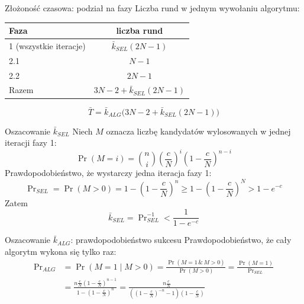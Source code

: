 \begin{frame}{Złożoność czasowa: podział na fazy}
  Liczba rund w jednym wywołaniu algorytmu:
  \medskip
  \begin{center}
    \renewcommand{\arraystretch}{1.3}
    \begin{tabular}{lc}
      \hline
      Faza & liczba rund \\
      \hline
      1 (wszystkie iteracje) & $\bar{k}_{SEL}(2N - 1)$ \\
      2.1                    & $N - 1$ \\
      2.2                    & $2N - 1$ \\
      \hline
      Razem                  & $3N - 2 + \bar{k}_{SEL}(2N - 1)$ \\
      \hline
    \end{tabular}
  \end{center}
  \pause
  \[
    \bar{T} = \bar{k}_{ALG}\bigl(3N - 2 + \bar{k}_{SEL}(2N - 1)\bigr)
  \]
\end{frame}

\begin{frame}{Oszacowanie $\bar{k}_{SEL}$}
  Niech $M$ oznacza liczbę kandydatów wylosowanych w jednej iteracji fazy 1:
  \[
    \Pr(M = i) = \binom{n}{i} \left(\frac{c}{N}\right)^{i}
                 \left(1 - \frac{c}{N}\right)^{n-i}
  \]
  \pause
  Prawdopodobieństwo, że wystarczy jedna iteracja fazy 1:
  \[
    \Pr\nolimits_{SEL} = \Pr(M > 0) = 1 - \left(1 - \frac{c}{N}\right)^{n}
    \geq 1 - \left(1 - \frac{c}{N}\right)^{N} > 1 - e^{-c}
  \]
  \pause
  Zatem
  \[
    \bar{k}_{SEL} = \Pr\nolimits_{SEL}^{-1} < \frac{1}{1 - e^{-c}}
  \]
\end{frame}

\begin{frame}{Oszacowanie $\bar{k}_{ALG}$: prawdopodobieństwo sukcesu}
  Prawdopodobieństwo, że cały algorytm wykona się tylko raz:
  \begin{align*}
    \Pr\nolimits_{ALG}
      &= \Pr(M = 1 \mid M > 0)
       = \frac{\Pr(M = 1 \,\&\, M > 0)}{\Pr(M > 0)}
       = \frac{\Pr(M = 1)}{\Pr\nolimits_{SEL}} \\
      &= \frac{n \frac{c}{N} \left(1 - \frac{c}{N}\right)^{n-1}}
              {1 - \left(1 - \frac{c}{N}\right)^{n}}
       = \frac{n \frac{c}{N}}
              {\left(\left(1 - \frac{c}{N}\right)^{-n} - 1\right)
               \left(1 - \frac{c}{N}\right)}
  \end{align*}
\end{frame}

